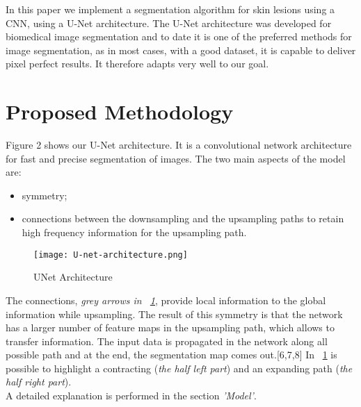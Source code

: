 \documentclass[12pt,a4paper,oneside]{report} %
\begin{document}
In this paper we implement a segmentation algorithm for skin lesions using a CNN, using a U-Net architecture. The U-Net architecture was developed for biomedical image segmentation and to date it is one of the preferred methods for image segmentation, as in most cases, with a good dataset, it is capable to deliver pixel perfect results. It therefore adapts very well to our goal.\\

\chapter*{Proposed Methodology}
\setcounter{secnumdepth}{0}

Figure 2 shows our U-Net architecture. It is a convolutional network architecture for fast and precise segmentation of images. The two main aspects of the model are:
\\\begin{itemize}
\item symmetry;
\item connections between the downsampling and the upsampling paths to retain high frequency information for the upsampling path.
\end{itemize}
\vspace{5mm}
\begin{figure}[ht]
\begin{center}
 \texttt{[image: U-net-architecture.png]}
\caption{UNet Architecture}
\label{fig:uneta}
\end{center}
\end{figure}

The connections, \textit {grey arrows in \figurename~\ref{fig:uneta}}, provide local information to the global information while upsampling. The result of this symmetry is that the network has a larger number of feature maps in the upsampling path, which allows to transfer information.
The input data is propagated in the network along all possible path and at the end, the segmentation map comes out.[6,7,8] 
In \figurename~\ref{fig:uneta} is possible to highlight a contracting (\textit {the half left part}) and an expanding path (\textit {the half right part}).\\
A detailed explanation is performed in the section \textit {'Model'}.\\
\newline
\end{document}
